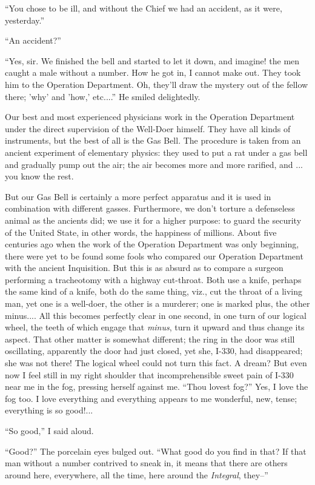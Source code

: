 \documentclass[11pt,openany]{book}
\begin{document}
``You chose to be ill, and without the Chief we had an accident, as it were, yesterday.''

``An accident?''

``Yes, sir. We finished the bell and started to let it down, and imagine! the men caught a male without a number. How he got in, I cannot make out. They took him to the Operation Department. Oh, they'll draw the mystery out of the fellow there; 'why' and 'how,' etc....'' He smiled delightedly.

Our best and most experienced physicians work in the Operation Department under the direct supervision of the Well-Doer himself. They have all kinds of instruments, but the best of all is the Gas Bell. The procedure is taken from an ancient experiment of elementary physics: they used to put a rat under a gas bell and gradually pump out the air; the air becomes more and more rarified, and ... you know the rest.

But our Gas Bell is certainly a more perfect apparatus and it is used in combination with different gasses. Furthermore, we don't torture a defenseless animal as the ancients did; we use it for a higher purpose: to guard the security of the United State, in other words, the happiness of millions. About five centuries ago when the work of the Operation Department was only beginning, there were yet to be found some fools who compared our Operation Department with the ancient Inquisition. But this is as absurd as to compare a surgeon performing a tracheotomy with a highway cut-throat. Both use a knife, perhaps the same kind of a knife, both do the same thing, viz., cut the throat of a living man, yet one is a well-doer, the other is a murderer; one is marked plus, the other minus.... All this becomes perfectly clear in one second, in one turn of our logical wheel, the teeth of which engage that \emph{minus}, turn it upward and thus change its aspect. That other matter is somewhat different; the ring in the door was still oscillating, apparently the door had just closed, yet she, I-330, had disappeared; she was not there! The logical wheel could not turn this fact. A dream? But even now I feel still in my right shoulder that incomprehensible sweet pain of I-330 near me in the fog, pressing herself against me. ``Thou lovest fog?'' Yes, I love the fog too. I love everything and everything appears to me wonderful, new, tense; everything is so good!...

``So good,'' I said aloud.

``Good?'' The porcelain eyes bulged out. ``What good do you find in that? If that man without a number contrived to sneak in, it means that there are others around here, everywhere, all the time, here around the \emph{Integral}, they--''
\end{document}
